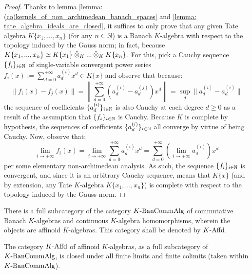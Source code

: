                 \begin{proof}
                    Thanks to lemma \ref{lemma: (co)kernels_of_non_archimedean_banach_spaces} and \ref{lemma: tate_algebra_ideals_are_closed}, it suffices to only prove that any given Tate algebra $K\{x_1, ..., x_n\}$ (for any $n \in \mathbb{N}$) is a Banach $K$-algebra with respect to the topology induced by the Gauss norm; in fact, because $K\{x_1, ..., x_n\} \cong K\{x_1\} \hattensor_K ... \hattensor_K K\{x_n\}$. For this, pick a Cauchy sequence $\{f_i\}_{i \in \mathbb{N}}$ of single-variable convergent power series $f_i(x) := \sum_{d = 0}^{+\infty} a_d^{(i)} x^d \in K\{x\}$ and observe that because:
                        $$\|f_i(x) - f_j(x)\| = \left\| \sum_{d = 0}^{+\infty} (a_d^{(i)} - a_d^{(j)}) x^d \right\| = \sup_d \|a_d^{(i)} - a_d^{(i)}\|$$
                    the sequence of coefficients $\{a_d^{(i)}\}_{i \in \mathbb{N}}$ is also Cauchy at each degree $d \geq 0$ as a result of the assumption that $\{f_i\}_{i \in \mathbb{N}}$ is Cauchy. Because $K$ is complete by hypothesis, the sequences of coefficients $\{a_d^{(i)}\}_{i \in \mathbb{N}}$ all converge by virtue of being Cauchy. Now, observe that:
                        $$\underset{i \to +\infty}{\lim} f_i(x) = \underset{i \to +\infty}{\lim} \sum_{d = 0}^{+\infty} a_d^{(i)} x^d = \sum_{d = 0}^{+\infty} \left( \underset{i \to +\infty}{\lim} a_d^{(i)} \right) x^d$$
                    per some elementary non-archimedean analysis. As such, the sequence $\{f_i\}_{i \in \mathbb{N}}$ is convergent, and since it is an arbitrary Cauchy sequence, means that $K\{x\}$ (and by extension, any Tate $K$-algebra $K\{x_1, ..., x_n\}$) is complete with respect to the topology induced by the Gauss norm. 
                \end{proof}
            \begin{corollary}
                There is a full subcategory of the category $K\text{-}\mathrm{Ban}\mathrm{Comm}\mathrm{Alg}$ of commutative Banach $K$-algebras and continuous $K$-algebra homomorphisms, wherein the objects are affinoid $K$-algebras. This category shall be denoted by $K\text{-}\mathrm{Affd}$.
                
                The category $K\text{-}\mathrm{Affd}$ of affinoid $K$-algebras, as a full subcategory of $K\text{-}\mathrm{Ban}\mathrm{Comm}\mathrm{Alg}$, is closed under all finite limits and finite colimits (taken within $K\text{-}\mathrm{Ban}\mathrm{Comm}\mathrm{Alg}$).
            \end{corollary}
            
